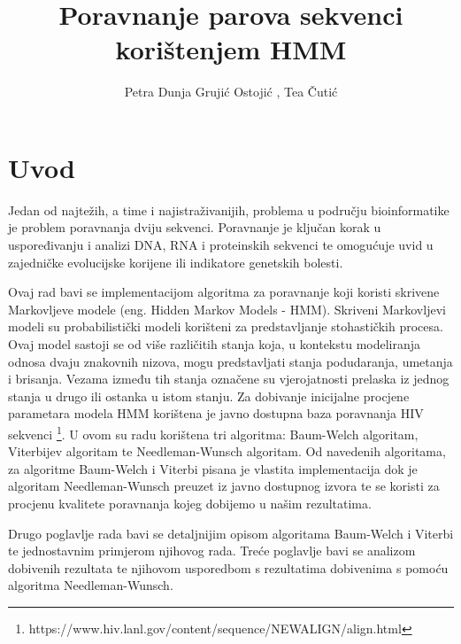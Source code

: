 \documentclass[times, utf8, seminar, numeric]{fer}
\begin{document}
\title{Poravnanje parova sekvenci korištenjem HMM}

\author{Petra Dunja Grujić Ostojić , Tea Čutić}


\maketitle

\tableofcontents

\chapter{Uvod}
Jedan od najtežih, a time i najistraživanijih, problema u području bioinformatike je problem poravnanja dviju sekvenci. Poravnanje je ključan korak u uspoređivanju i analizi DNA, RNA i proteinskih sekvenci te omogućuje uvid u zajedničke evolucijske korijene ili indikatore genetskih bolesti.

\bigskip

Ovaj rad bavi se implementacijom algoritma za poravnanje koji koristi skrivene  Markovljeve modele (eng. Hidden Markov Models - HMM). Skriveni Markovljevi modeli su probabilistički modeli korišteni za predstavljanje stohastičkih procesa. Ovaj model sastoji se od više različitih stanja koja, u kontekstu modeliranja odnosa dvaju znakovnih nizova, mogu predstavljati stanja podudaranja, umetanja i brisanja. Vezama između tih stanja označene su vjerojatnosti prelaska iz jednog stanja u drugo ili ostanka u istom stanju. Za dobivanje inicijalne procjene parametara modela HMM korištena je javno dostupna baza poravnanja HIV sekvenci \footnote{https://www.hiv.lanl.gov/content/sequence/NEWALIGN/align.html}. U ovom su radu korištena tri algoritma: Baum-Welch algoritam, Viterbijev algoritam te Needleman-Wunsch algoritam. Od navedenih algoritama, za algoritme Baum-Welch i Viterbi pisana je vlastita implementacija dok je algoritam Needleman-Wunsch preuzet iz javno dostupnog izvora te se koristi za procjenu kvalitete poravnanja kojeg dobijemo u našim rezultatima.

\bigskip

Drugo poglavlje rada bavi se detaljnijim opisom algoritama Baum-Welch i Viterbi te jednostavnim primjerom njihovog rada. Treće poglavlje bavi se analizom dobivenih rezultata te njihovom usporedbom s rezultatima dobivenima s pomoću algoritma Needleman-Wunsch.
\end{document}
